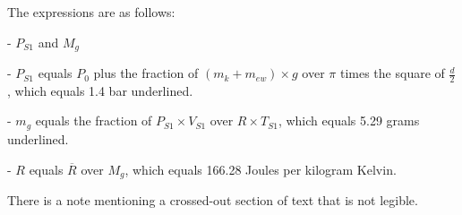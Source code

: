 The expressions are as follows:

- \( P_{S1} \) and \( M_{g} \)

- \( P_{S1} \) equals \( P_{0} \) plus the fraction of \( (m_{k} + m_{ew}) \times g \) over \( \pi \) times the square of \( \frac{d}{2} \), which equals 1.4 bar underlined.

- \( m_{g} \) equals the fraction of \( P_{S1} \times V_{S1} \) over \( R \times T_{S1} \), which equals 5.29 grams underlined.

- \( R \) equals \( \overline{R} \) over \( M_{g} \), which equals 166.28 Joules per kilogram Kelvin.

There is a note mentioning a crossed-out section of text that is not legible.